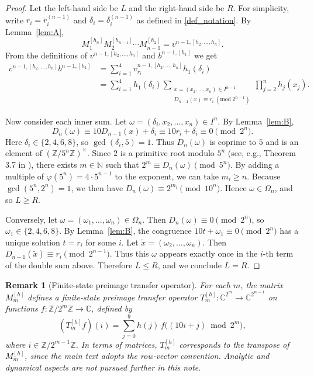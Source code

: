 \documentclass[11pt,a4paper]{article}
\newtheorem{remark}{Remark}
\theoremstyle{plain}
\begin{document}
\begin{proof}
Let the left-hand side be $L$ and the right-hand side be $R$.  
For simplicity, write $r_i=r_i^{(n-1)}$ and $\delta_i=\delta_i^{(n-1)}$ as defined in \eqref{def_notation}.  
By Lemma~\ref{lem:A},
\[
M_1^{[h_n]} M_2^{[h_{n-1}]} \cdots M_{n-1}^{[h_2]}
= v^{n-1,[h_2,\dots,h_n]}.
\]
From the definitions of $v^{n-1,[h_2,\dots,h_n]}$ and $b^{n-1,[h_1]}$ we get
\begin{align*}
v^{n-1,[h_2,\dots,h_n]}  b^{n-1,[h_1]}
&= \sum_{i=1}^4 v_{r_i}^{n-1,[h_2,\dots,h_n]} h_1(\delta_i) \\
&= \sum_{i=1}^4 h_1(\delta_i)
   \sum_{\substack{x=(x_2,\dots,x_n)\in I^{n-1}\\ D_{n-1}(x)\equiv r_i\ (\mathrm{mod}\ 2^{n-1})}}
   \prod_{j=2}^n h_j(x_j).
\end{align*}

Now consider each inner sum.  
Let $\omega=(\delta_i,x_2,\dots,x_n)\in I^n$.  
By Lemma~\ref{lem:B},
\[
D_n(\omega)\equiv 10D_{n-1}(x)+\delta_i \equiv 10r_i+\delta_i \equiv 0 \pmod{2^n}.
\]
Here $\delta_i\in\{2,4,6,8\}$, so $\gcd(\delta_i,5)=1$.  
Thus $D_n(\omega)$ is coprime to $5$ and is an element of $(\mathbb{Z}/5^n\mathbb{Z})^\times$.  
Since $2$ is a primitive root modulo $5^n$ (see, e.g., Theorem 3.7 in \cite{nathanson2000}), there exists $m\in\mathbb{N}$ such that
$2^{m}\equiv D_n(\omega)\pmod{5^n}$.  
By adding a multiple of $\varphi(5^n)=4\cdot 5^{n-1}$ to the exponent, we can take $m_i\ge n$.  
Because $\gcd(5^n,2^n)=1$, we then have $D_n(\omega)\equiv 2^{m_i}\pmod{10^n}$.
Hence $\omega\in\Omega_n$, and so $L\ge R$.

Conversely, let $\omega=(\omega_1,\dots,\omega_n)\in\Omega_n$.  
Then $D_n(\omega)\equiv 0 \pmod{2^n}$, so $\omega_1\in\{2,4,6,8\}$.  
By Lemma~\ref{lem:B}, the congruence $10t+\omega_1\equiv 0 \pmod{2^n}$ has a unique solution $t=r_i$ for some $i$.  
Let $\tilde{x}=(\omega_2,\dots,\omega_n)$. Then $D_{n-1}(\tilde{x})\equiv r_i \pmod{2^{n-1}}$.  
Thus this $\omega$ appears exactly once in the $i$-th term of the double sum above.  
Therefore $L\le R$, and we conclude $L=R$.
\end{proof}

\begin{remark}[Finite-state preimage transfer operator]
For each $m$, the matrix $M_m^{[h]}$ defines a finite-state preimage transfer operator
\(T_m^{[h]} \colon \mathbb{C}^{2^{m}}\to\mathbb{C}^{2^{m-1}}\) on functions
\(f:\mathbb{Z}/2^{m}\mathbb{Z}\to\mathbb{C}\), defined by
\[
(T_m^{[h]} f)(i)=\sum_{j=0}^9 h(j)\, f\bigl((10i+j)\bmod 2^{m}\bigr),
\]
where \(i\in \mathbb{Z}/2^{m-1}\mathbb{Z}\).
In terms of matrices, \(T_m^{[h]}\) corresponds to the transpose of \(M_m^{[h]}\),
since the main text adopts the row-vector convention.
Analytic and dynamical aspects are not pursued further in this note.
\end{remark}
\end{document}
